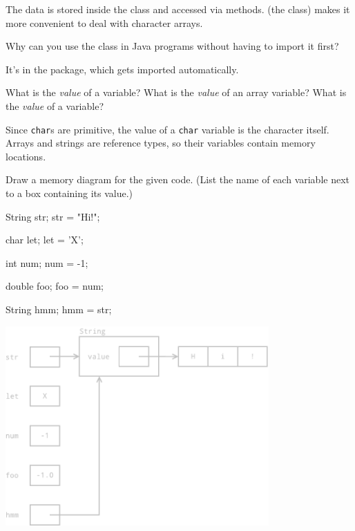 \begin{answer}
The data is stored inside the class and accessed via methods.
 (the class) makes it more convenient to deal with character arrays.
\end{answer}


\Q Why can you use the  class in Java programs without having to import it first?

\begin{answer}
It's in the  package, which gets imported automatically.
\end{answer}


\Q What is the {\it value} of a  variable?
What is the {\it value} of an array variable?
What is the {\it value} of a  variable?

\begin{answer}
Since {\tt char}s are primitive, the value of a {\tt char} variable is the character itself.
Arrays and strings are reference types, so their variables contain memory locations.
\end{answer}


\Q \label{diagram}
Draw a memory diagram for the given code.
(List the name of each variable next to a box containing its value.)

\hspace*{1em}
\begin{minipage}{0.25\linewidth}

\begin{javalst}
String str;
str = "Hi!";

char let;
let = 'X';

int num;
num = -1;

double foo;
foo = num;

String hmm;
hmm = str;
\end{javalst}

\end{minipage}
\begin{minipage}{0.65\linewidth}

\begin{answer}[3.1in]
\includegraphics[height=3in]{string2.pdf}
\end{answer}

\end{minipage}



